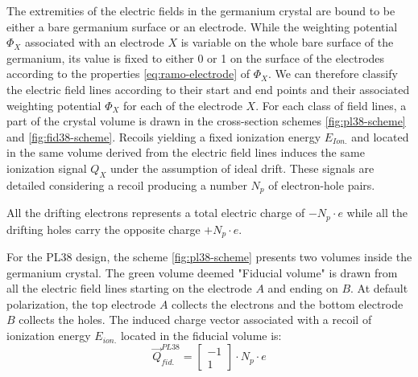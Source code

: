 The extremities of the electric fields in the germanium crystal are bound to be either a bare germanium surface or an electrode. While the weighting potential $\Phi_X$ associated with an electrode $X$ is variable on the whole bare surface of the germanium, its value is fixed to either 0 or 1 on the surface of the electrodes according to the properties \ref{eq:ramo-electrode} of $\Phi_X$. 
We can therefore classify the electric field lines according to their start and end points and their associated weighting potential $\Phi_X$ for each of the electrode $X$. For each class of field lines, a part of the crystal volume is drawn in the cross-section schemes \ref{fig:pl38-scheme} and \ref{fig:fid38-scheme}. Recoils yielding a fixed ionization energy $E_{Ion.}$ and located in the same volume derived from the electric field lines induces the same ionization signal $Q_X$ under the assumption of ideal drift. These signals are detailed considering a recoil producing a number $N_p$ of electron-hole pairs.

All the drifting electrons represents a total electric charge of $- N_p \cdot e$ while all the drifting holes carry the opposite charge $+ N_p \cdot e$.

%
%
%

For the PL38 design, the scheme \ref{fig:pl38-scheme} presents two volumes inside the germanium crystal. The green volume deemed "Fiducial volume" is drawn from all the electric field lines starting on the electrode $A$ and ending on $B$. At default polarization, the top electrode $A$ collects the electrons and the bottom electrode $B$ collects the holes. The induced charge vector associated with a recoil of ionization energy $E_{ion.}$ located in the fiducial volume is:
\begin{equation}
\label{eq:pl38-induced-charges}
\vec{Q}_{fid.}^{PL38} =
\begin{bmatrix}
-1 \\ 1
\end{bmatrix}
\cdot N_p \cdot e
\end{equation}

